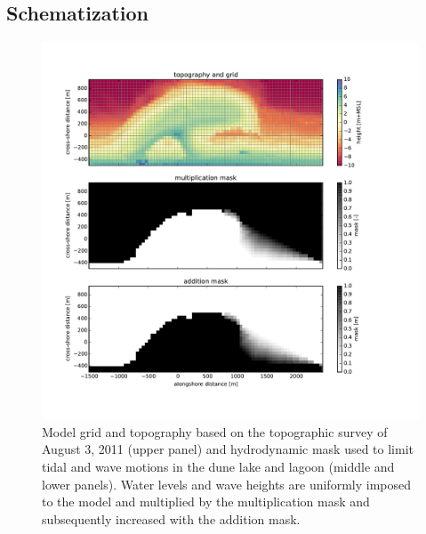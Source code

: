 \subsection{Schematization}

\begin{figure}
  \centering
  \includegraphics[width=\columnwidth]{../Figures/gridmask}
  \caption{Model grid and topography based on the topographic survey
    of August 3, 2011 (upper panel) and hydrodynamic mask used to
    limit tidal and wave motions in the dune lake and lagoon (middle
    and lower panels). Water levels and wave heights are uniformly
    imposed to the model and multiplied by the multiplication mask and
    subsequently increased with the addition mask.}
  \label{fig:gridmask}
\end{figure}


